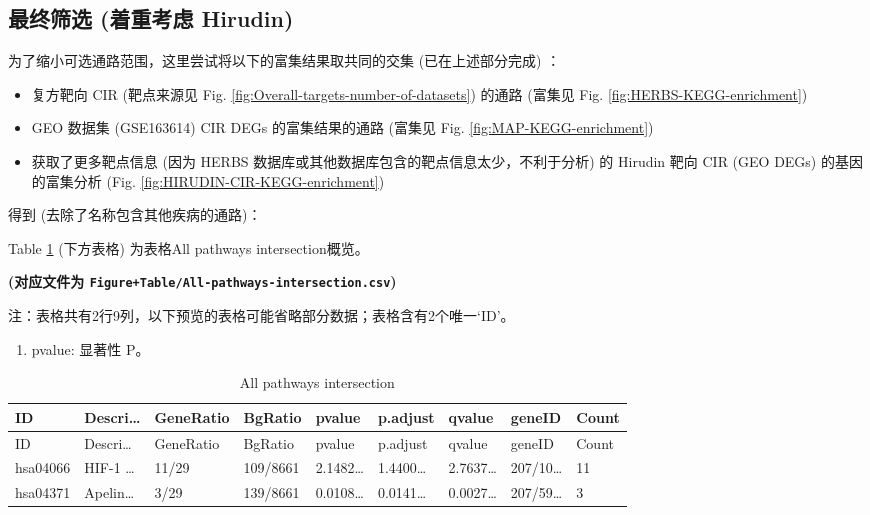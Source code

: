 \documentclass[
]{article}
\providecommand{\tightlist}{%
  \setlength{\itemsep}{0pt}\setlength{\parskip}{0pt}}
\begin{document}
\hypertarget{ux6700ux7ec8ux7b5bux9009-ux7740ux91cdux8003ux8651-hirudin}{%
\subsection{最终筛选 (着重考虑 Hirudin)}\label{ux6700ux7ec8ux7b5bux9009-ux7740ux91cdux8003ux8651-hirudin}}

为了缩小可选通路范围，这里尝试将以下的富集结果取共同的交集 (已在上述部分完成) ：

\begin{itemize}
\tightlist
\item
  复方靶向 CIR (靶点来源见 Fig. \ref{fig:Overall-targets-number-of-datasets}) 的通路
  (富集见 Fig. \ref{fig:HERBS-KEGG-enrichment})
\item
  GEO 数据集 (GSE163614) CIR DEGs 的富集结果的通路 (富集见 Fig. \ref{fig:MAP-KEGG-enrichment})
\item
  获取了更多靶点信息 (因为 HERBS 数据库或其他数据库包含的靶点信息太少，不利于分析) 的 Hirudin 靶向 CIR (GEO DEGs) 的基因的富集分析 (Fig. \ref{fig:HIRUDIN-CIR-KEGG-enrichment})
\end{itemize}

得到 (去除了名称包含其他疾病的通路)：

Table \ref{tab:All-pathways-intersection} (下方表格) 为表格All pathways intersection概览。

\textbf{(对应文件为 \texttt{Figure+Table/All-pathways-intersection.csv})}

\begin{center}\begin{tcolorbox}[colback=gray!10, colframe=gray!50, width=0.9\linewidth, arc=1mm, boxrule=0.5pt]注：表格共有2行9列，以下预览的表格可能省略部分数据；表格含有2个唯一`ID'。
\end{tcolorbox}
\end{center}
\begin{center}\begin{tcolorbox}[colback=gray!10, colframe=gray!50, width=0.9\linewidth, arc=1mm, boxrule=0.5pt]\begin{enumerate}\tightlist
\item pvalue:  显著性 P。
\end{enumerate}\end{tcolorbox}
\end{center}

\begin{longtable}[]{@{}lllllllll@{}}
\caption{\label{tab:All-pathways-intersection}All pathways intersection}\tabularnewline
\toprule
ID & Descri\ldots{} & GeneRatio & BgRatio & pvalue & p.adjust & qvalue & geneID & Count\tabularnewline
\midrule
\endfirsthead
\toprule
ID & Descri\ldots{} & GeneRatio & BgRatio & pvalue & p.adjust & qvalue & geneID & Count\tabularnewline
\midrule
\endhead
hsa04066 & HIF-1 \ldots{} & 11/29 & 109/8661 & 2.1482\ldots{} & 1.4400\ldots{} & 2.7637\ldots{} & 207/10\ldots{} & 11\tabularnewline
hsa04371 & Apelin\ldots{} & 3/29 & 139/8661 & 0.0108\ldots{} & 0.0141\ldots{} & 0.0027\ldots{} & 207/59\ldots{} & 3\tabularnewline
\bottomrule
\end{longtable}
\end{document}
